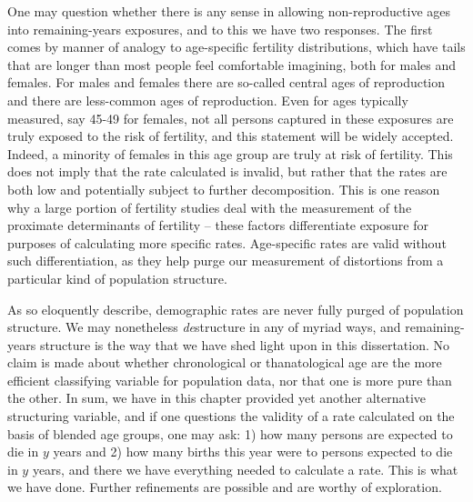 One may question whether there is any sense in allowing non-reproductive ages
into remaining-years exposures, and to this we have two responses. The first
comes by manner of analogy to age-specific fertility distributions, which
have tails that are longer than most people feel comfortable imagining, 
both for males and females. For males and
females there are so-called central ages of reproduction and there are
less-common ages of reproduction. Even for ages typically measured, say
45-49 for females, not all persons captured in these exposures are truly
exposed to the risk of fertility, and this statement will be widely accepted.
Indeed, a minority of females in this age group are truly at risk of fertility.
This does not imply that the rate calculated is invalid, but rather that the rates are both low and
potentially subject to further decomposition. This is one reason why a large
portion of fertility studies deal with the measurement of the proximate
determinants of fertility -- these factors differentiate exposure for purposes of calculating more specific rates.
Age-specific rates are valid without such differentiation, as they help purge
our measurement of distortions from a particular kind of population structure. 

As \citet{stolnitz1949recent} so eloquently describe, demographic rates are
never fully purged of population structure. We may nonetheless \textit{de}structure in
any of myriad ways, and remaining-years structure is the way that we have shed
light upon in this dissertation. No claim is made about whether chronological or
thanatological age are the more efficient classifying variable for population
data, nor that one is more pure than the other. In sum, we have in this
chapter provided yet another alternative structuring variable, and if one
questions the validity of a rate calculated on the basis of blended age groups,
one may ask: 1) how many persons are expected to die in $y$ years and 2) how
many births this year were to persons expected to die in $y$ years, and there we
have everything needed to calculate a rate. This is what we have done. Further
refinements are possible and are worthy of exploration.

